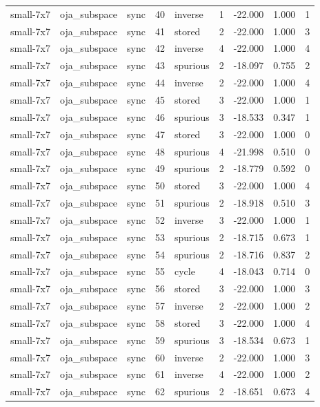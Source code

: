 \begin{tabular}{lllrlrrrr}
small-7x7 & oja\_subspace & sync & 40 & inverse & 1 & -22.000 & 1.000 & 1 \\
small-7x7 & oja\_subspace & sync & 41 & stored & 2 & -22.000 & 1.000 & 3 \\
small-7x7 & oja\_subspace & sync & 42 & inverse & 4 & -22.000 & 1.000 & 4 \\
small-7x7 & oja\_subspace & sync & 43 & spurious & 2 & -18.097 & 0.755 & 2 \\
small-7x7 & oja\_subspace & sync & 44 & inverse & 2 & -22.000 & 1.000 & 4 \\
small-7x7 & oja\_subspace & sync & 45 & stored & 3 & -22.000 & 1.000 & 1 \\
small-7x7 & oja\_subspace & sync & 46 & spurious & 3 & -18.533 & 0.347 & 1 \\
small-7x7 & oja\_subspace & sync & 47 & stored & 3 & -22.000 & 1.000 & 0 \\
small-7x7 & oja\_subspace & sync & 48 & spurious & 4 & -21.998 & 0.510 & 0 \\
small-7x7 & oja\_subspace & sync & 49 & spurious & 2 & -18.779 & 0.592 & 0 \\
small-7x7 & oja\_subspace & sync & 50 & stored & 3 & -22.000 & 1.000 & 4 \\
small-7x7 & oja\_subspace & sync & 51 & spurious & 2 & -18.918 & 0.510 & 3 \\
small-7x7 & oja\_subspace & sync & 52 & inverse & 3 & -22.000 & 1.000 & 1 \\
small-7x7 & oja\_subspace & sync & 53 & spurious & 2 & -18.715 & 0.673 & 1 \\
small-7x7 & oja\_subspace & sync & 54 & spurious & 2 & -18.716 & 0.837 & 2 \\
small-7x7 & oja\_subspace & sync & 55 & cycle & 4 & -18.043 & 0.714 & 0 \\
small-7x7 & oja\_subspace & sync & 56 & stored & 3 & -22.000 & 1.000 & 3 \\
small-7x7 & oja\_subspace & sync & 57 & inverse & 2 & -22.000 & 1.000 & 2 \\
small-7x7 & oja\_subspace & sync & 58 & stored & 3 & -22.000 & 1.000 & 4 \\
small-7x7 & oja\_subspace & sync & 59 & spurious & 3 & -18.534 & 0.673 & 1 \\
small-7x7 & oja\_subspace & sync & 60 & inverse & 2 & -22.000 & 1.000 & 3 \\
small-7x7 & oja\_subspace & sync & 61 & inverse & 4 & -22.000 & 1.000 & 2 \\
small-7x7 & oja\_subspace & sync & 62 & spurious & 2 & -18.651 & 0.673 & 4 \\

\end{tabular}
